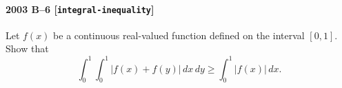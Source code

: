 \paragraph{2003 B--6 \textnormal{[\texttt{integral-inequality}]}}
Let $f(x)$ be a continuous real-valued function defined on the interval
$[0,1]$. Show that
\[
   \int_0^1 \int_0^1 | f(x) + f(y) |\,dx\,dy \geq \int_0^1 |f(x)|\,dx.
\]
